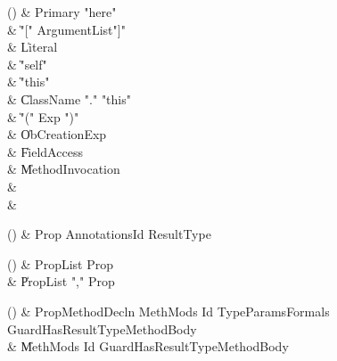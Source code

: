 \begin{bbgrammarappendix}

() & Primary \label{prod:Primary}  \: \xcd"here"  \\

 &    \| \xcd"[" ArgumentList\opt \xcd"]" \\
 &    \| Literal \\
 &    \| \xcd"self" \\
 &    \| \xcd"this" \\
 &    \| ClassName \xcd"." \xcd"this" \\
 &    \| \xcd"(" Exp \xcd")" \\
 &    \| ObCreationExp \\
 &    \| FieldAccess \\
 &    \| MethodInvocation \\
 &    \|  \\
 &    \|  \\

\end{bbgrammarappendix}

\begin{bbgrammarappendix}

() & Prop \label{prod:Prop}  \: Annotations\opt Id ResultType  \\


\end{bbgrammarappendix}

\begin{bbgrammarappendix}

() & PropList \label{prod:PropList}  \: Prop  \\

 &    \| PropList \xcd"," Prop \\

\end{bbgrammarappendix}

\begin{bbgrammarappendix}

() & PropMethodDecln \label{prod:PropMethodDecln}  \: MethMods Id TypeParams\opt Formals Guard\opt HasResultType\opt MethodBody  \\

 &    \| MethMods Id Guard\opt HasResultType\opt MethodBody \\

\end{bbgrammarappendix}

